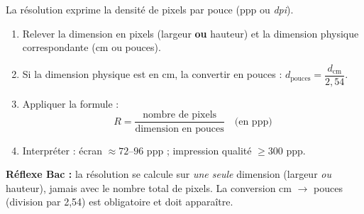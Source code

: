 \documentclass[11pt]{article}
\newcommand{\cle}[1]{{\popxbold\color{popdark}#1}}
\begin{document}
\begin{methode}
La résolution exprime la densité de pixels par pouce (\cle{ppp} ou \emph{dpi}).
\begin{enumerate}
  \item Relever la dimension en pixels (largeur \textbf{ou} hauteur) et la dimension physique correspondante (cm ou pouces).
  \item Si la dimension physique est en cm, la convertir en pouces : $d_{\text{pouces}} = \dfrac{d_{\text{cm}}}{2,54}$.
  \item Appliquer la formule :
  \[ R = \frac{\text{nombre de pixels}}{\text{dimension en pouces}} \quad \text{(en ppp)} \]
  \item Interpréter : écran $\approx 72\text{--}96$ ppp ; impression qualité $\ge 300$ ppp.
\end{enumerate}
\textbf{Réflexe Bac :} la résolution se calcule sur \emph{une seule} dimension (largeur \emph{ou} hauteur), jamais avec le nombre total de pixels. La conversion cm $\to$ pouces (division par 2,54) est obligatoire et doit apparaître.
\end{methode}
\end{document}
